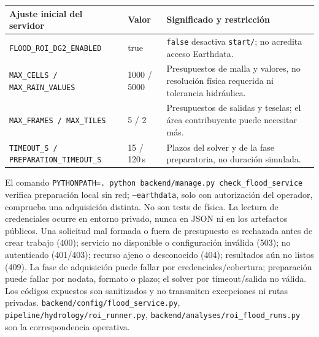 \documentclass[11pt,a4paper]{article}
\newcommand{\src}[1]{\nolinkurl{#1}}
\begin{document}
\noindent\begin{tabularx}{\linewidth}{p{.28\linewidth}p{.15\linewidth}X}
\toprule Ajuste inicial del servidor & Valor & Significado y restricción\\\midrule
\texttt{FLOOD\_ROI\_DG2\_ENABLED} & true & \texttt{false} desactiva \texttt{start/}; no acredita acceso Earthdata.\\
\texttt{MAX\_CELLS / MAX\_RAIN\_VALUES} & 1000 / 5000 & Presupuestos de malla y valores, no resolución física requerida ni tolerancia hidráulica.\\
\texttt{MAX\_FRAMES / MAX\_TILES} & 5 / 2 & Presupuestos de salidas y teselas; el área contribuyente puede necesitar más.\\
\texttt{TIMEOUT\_S / PREPARATION\_TIMEOUT\_S} & 15 / 120\,s & Plazos del solver y de la fase preparatoria, no duración simulada.\\\bottomrule
\end{tabularx}
El comando \texttt{PYTHONPATH=. python backend/manage.py check\_flood\_service} verifica preparación local sin red; \texttt{--earthdata}, solo con autorización del operador, comprueba una adquisición distinta. No son tests de física. La lectura de credenciales ocurre en entorno privado, nunca en JSON ni en los artefactos públicos. Una solicitud mal formada o fuera de presupuesto es rechazada antes de crear trabajo (400); servicio no disponible o configuración inválida (503); no autenticado (401/403); recurso ajeno o desconocido (404); resultados aún no listos (409). La fase de adquisición puede fallar por credenciales/cobertura; preparación puede fallar por nodata, formato o plazo; el solver por timeout/salida no válida. Los códigos expuestos son sanitizados y no transmiten excepciones ni rutas privadas. \src{backend/config/flood_service.py}, \src{pipeline/hydrology/roi_runner.py}, \src{backend/analyses/roi_flood_runs.py} son la correspondencia operativa.
\end{document}
